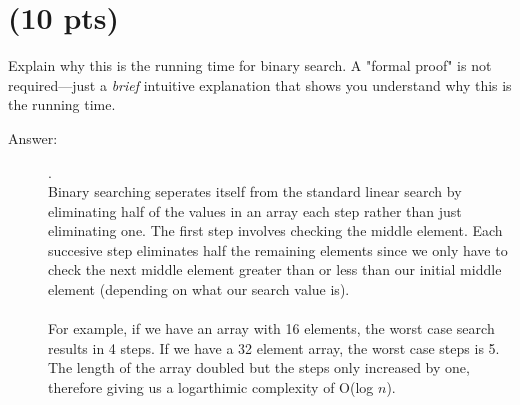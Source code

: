 \documentclass[11pt]{article}
\begin{document}
\section{(10 pts)}
\label{sec:org88ffa43}
Explain why this is the running time for binary search. A "formal proof" is not required—just a \emph{brief} intuitive explanation that shows you understand why this is the running time.

\begin{description}
    \item[Answer:] .\\
     Binary searching seperates itself from the standard linear search by eliminating half of the values in an array each step rather than just eliminating one.
     The first step involves checking the middle element.
     Each succesive step eliminates half the remaining elements since we only have to check the next middle element greater than or less than our initial middle element (depending on what our search value is).\\\\
     For example, if we have an array with 16 elements, the worst case search results in 4 steps.
     If we have a 32 element array, the worst case steps is 5.
     The length of the array doubled but the steps only increased by one, therefore giving us a logarthimic complexity of O(log $n$).
\end{description}
\end{document}
